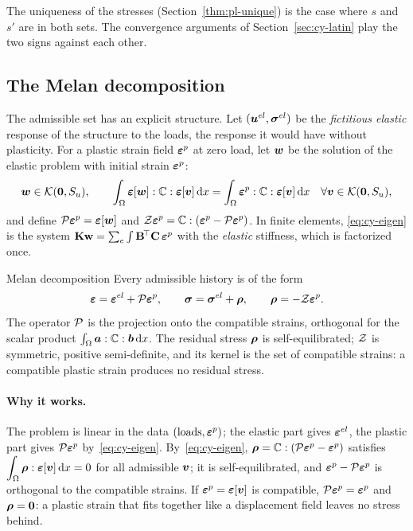 The uniqueness of the stresses (Section~\ref{thm:pl-unique}) is the case where
$s$ and $s'$ are in both sets. The convergence arguments of
Section~\ref{sec:cy-latin} play the two signs against each other.

\subsection{The Melan decomposition}
%
The admissible set has an explicit structure. Let $(\bm{u}^{el},\bm{\sigma}^{el})$ be the
\emph{fictitious elastic} response of the structure to the loads, the
response it would have without plasticity. For a plastic strain field $\bm{\varepsilon}^{p}$
at zero load, let $\bm{w}$ be the solution of the elastic problem with initial
strain $\bm{\varepsilon}^{p}$:
\begin{equation}\label{eq:cy-eigen}
  \bm{w}\in\mathcal{K}(\bm{0},S_u),\qquad
  \int_\Omega\bm{\varepsilon}[\bm{w}]:\mathbb{C}:\bm{\varepsilon}[\bm{v}]\,\mathrm{d} x=\int_\Omega\bm{\varepsilon}^{p}:\mathbb{C}:\bm{\varepsilon}[\bm{v}]\,\mathrm{d} x
  \quad\forall\bm{v}\in\mathcal{K}(\bm{0},S_u),
\end{equation}
and define $\mathcal{P}\bm{\varepsilon}^{p}=\bm{\varepsilon}[\bm{w}]$ and $\mathcal{Z}\bm{\varepsilon}^{p}=\mathbb{C}:(\bm{\varepsilon}^{p}-\mathcal{P}\bm{\varepsilon}^{p})$.
In finite elements, \eqref{eq:cy-eigen} is the system
$\mathbf{K}\mathbf{w}=\sum_e\int\mathbf{B}^{\!\top}\mathbf{C}\,\bm{\varepsilon}^{p}$ with the \emph{elastic}
stiffness, which is factorized once.

\begin{gbox}{Melan decomposition}\label{prop:cy-melan}
Every admissible history is of the form
\begin{equation}\label{eq:cy-melan}
  \bm{\varepsilon}=\bm{\varepsilon}^{el}+\mathcal{P}\bm{\varepsilon}^{p},\qquad
  \bm{\sigma}=\bm{\sigma}^{el}+\bm{\rho},\qquad \bm{\rho}=-\mathcal{Z}\bm{\varepsilon}^{p} .
\end{equation}
The operator $\mathcal{P}$ is the projection onto the compatible strains, orthogonal
for the scalar product $\int_\Omega\bm{a}:\mathbb{C}:\bm{b}\,\mathrm{d} x$. The residual
stress $\bm{\rho}$ is self-equilibrated; $\mathcal{Z}$ is symmetric, positive
semi-definite, and its kernel is the set of compatible strains: a compatible
plastic strain produces no residual stress.
\end{gbox}
\paragraph{Why it works.} The problem is linear in the data $(\text{loads},\bm{\varepsilon}^{p})$; the elastic part
gives $\bm{\varepsilon}^{el}$, the plastic part gives $\mathcal{P}\bm{\varepsilon}^{p}$ by~\eqref{eq:cy-eigen}.
By~\eqref{eq:cy-eigen}, $\bm{\rho}=\mathbb{C}:(\mathcal{P}\bm{\varepsilon}^{p}-\bm{\varepsilon}^{p})$ satisfies
$\displaystyle \int_\Omega\bm{\rho}:\bm{\varepsilon}[\bm{v}]\,\mathrm{d} x=0$ for all admissible $\bm{v}$; it is
self-equilibrated, and $\bm{\varepsilon}^{p}-\mathcal{P}\bm{\varepsilon}^{p}$ is orthogonal to the compatible strains.
If $\bm{\varepsilon}^{p}=\bm{\varepsilon}[\bm{v}]$ is compatible, $\mathcal{P}\bm{\varepsilon}^{p}=\bm{\varepsilon}^{p}$ and $\bm{\rho}=\bm{0}$: a
plastic strain that fits together like a displacement field leaves no stress
behind.

